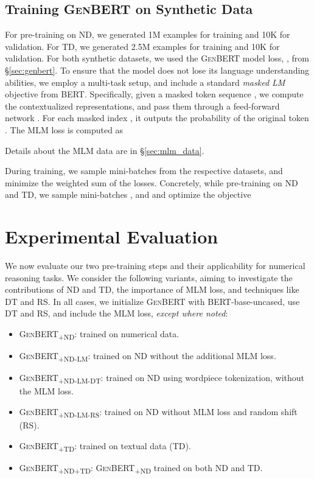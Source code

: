 \documentclass[11pt,a4paper]{article}
\newcommand\ssc[1]{\textsubscript{\textsc{#1}}}
\newcommand\bert{\textsc{BERT}}
\newcommand\genbert{\textsc{GenBERT}}
\begin{document}
\subsection{Training \genbert{} on Synthetic Data}


For pre-training on ND, we generated 1M examples for training and 10K for validation. For TD, we generated 2.5M examples for training and 10K for validation. For both synthetic datasets, we used the \genbert{} model loss, , from \S\ref{sec:genbert}. To ensure that the model does not lose its language understanding abilities, we employ a multi-task setup, and include a standard \emph{masked LM} objective from \bert{}. Specifically, given a masked token sequence ,
we compute the contextualized representations,  and
pass them through a feed-forward network . For each masked index , it outputs the probability  of the original token . The MLM loss is computed as 

Details about the MLM data are in \S\ref{sec:mlm_data}.

During training, we sample mini-batches from the respective datasets, and minimize the weighted sum of the losses. Concretely, while pre-training on ND and TD, we sample mini-batches ,  and  and optimize the objective 





%
 \section{Experimental Evaluation}

We now evaluate our two pre-training steps and their applicability for numerical reasoning tasks. 
We consider the following variants, aiming to investigate the contributions of ND and TD, the importance of MLM loss, and techniques like DT and RS. In all cases, we initialize \genbert{} with \bert{}-base-uncased, use DT and RS, and include the MLM loss, \textit{except where noted}:
\begin{itemize}[topsep=0pt, itemsep=1pt, leftmargin=.1in, parsep=2pt]
    \item \textsc{GenBERT\ssc{+ND}}: trained on numerical data.
    \item \textsc{GenBERT\ssc{+ND-LM}}: trained on ND without the additional MLM loss.
    \item \textsc{GenBERT\ssc{+ND-LM-DT}}: trained on ND using wordpiece tokenization, without the MLM loss.
    \item \textsc{GenBERT\ssc{+ND-LM-RS}}: trained on ND without MLM loss and random shift (RS).
    \item \textsc{GenBERT\ssc{+TD}}: trained on textual data (TD). 
    \item \textsc{GenBERT\ssc{+ND+TD}}: \textsc{GenBERT\ssc{+ND}} trained on both ND and TD.
\end{itemize}
\end{document}
